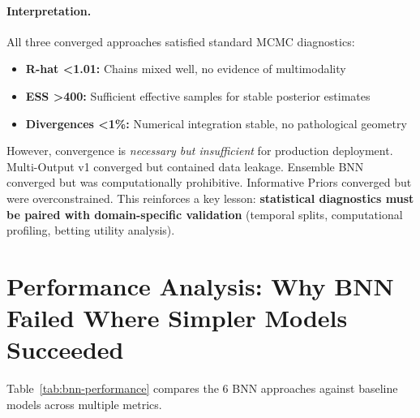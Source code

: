 \paragraph{Interpretation.}
All three converged approaches satisfied standard MCMC diagnostics:
\begin{itemize}[itemsep=2pt,parsep=0pt]
    \item \textbf{R-hat <1.01:} Chains mixed well, no evidence of multimodality
    \item \textbf{ESS >400:} Sufficient effective samples for stable posterior estimates
    \item \textbf{Divergences <1\%:} Numerical integration stable, no pathological geometry
\end{itemize}

However, convergence is \textit{necessary but insufficient} for production deployment. Multi-Output v1 converged but contained data leakage. Ensemble BNN converged but was computationally prohibitive. Informative Priors converged but were overconstrained. This reinforces a key lesson: \textbf{statistical diagnostics must be paired with domain-specific validation} (temporal splits, computational profiling, betting utility analysis).

\section{Performance Analysis: Why BNN Failed Where Simpler Models Succeeded}

Table~\ref{tab:bnn-performance} compares the 6 BNN approaches against baseline models across multiple metrics.

